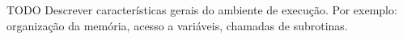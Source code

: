 
TODO Descrever características gerais do ambiente de execução. Por exemplo: organização da memória, acesso a variáveis, chamadas de subrotinas.
